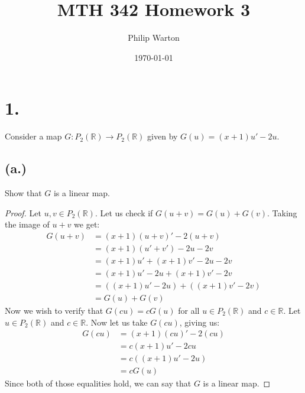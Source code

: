 \documentclass{article}
\begin{document}
\title{MTH 342 Homework 3}
\author{Philip Warton}
\date{\today}
\maketitle

\section*{1.}
	Consider a map $G  : P_2(\mathbb{R}) \rightarrow P_2(\mathbb{R})$ given by $G(u)=(x+1)u'-2u$.
	\subsection*{(a.)}
		Show that $G$ is a linear map.
		\begin{proof}
			Let $u, v \in P_2(\mathbb{R})$.
			Let us check if $G(u+v) = G(u) + G(v)$.
			Taking the image of $u + v$ we get:
			\begin{align*}
				G(u+v) & = (x+1)(u+v)'-2(u+v)\\
				& = (x+1)(u' + v')-2u-2v\\
				& = (x+1)u' + (x+1)v' - 2u - 2v\\
				& = (x+1)u' - 2u + (x+1)v' - 2v\\
				& = ((x+1)u' -2u) + ((x+1)v'-2v)\\
				& = G(u) + G(v)
			\end{align*}
			Now we wish to verify that $G(cu)  = cG(u)$ for all $u \in P_2(\mathbb{R})$ and $c \in  \mathbb{R}$.
			Let $u \in P_2(\mathbb{R})$ and $c \in  \mathbb{R}$.
			Now let us take $G(cu)$, giving us:
			\begin{align*}
				G(cu) & = (x+1)(cu)'-2(cu) \\
				& = c(x+1)u' -2cu \\
				& = c((x+1)u' -2u) \\
				& = cG(u)
			\end{align*}
			Since both of those equalities hold, we can say that $G$ is a linear map.

		\end{proof}
\end{document}
